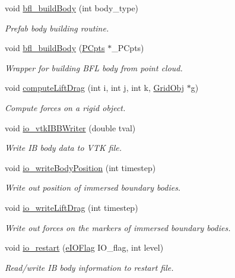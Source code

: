 \begin{DoxyCompactItemize}
void \hyperlink{class_object_manager_ab14652a66537fba9f49a68d6e11605e0}{bfl\+\_\+build\+Body} (int body\+\_\+type)
\begin{DoxyCompactList}\small\item\em Prefab body building routine. \end{DoxyCompactList}\item 
void \hyperlink{class_object_manager_a8cd5fa724cbd50bcd00b940e5ae4a687}{bfl\+\_\+build\+Body} (\hyperlink{class_p_cpts}{P\+Cpts} $\ast$\+\_\+\+P\+Cpts)
\begin{DoxyCompactList}\small\item\em Wrapper for building B\+FL body from point cloud. \end{DoxyCompactList}\item 
void \hyperlink{class_object_manager_a6a35b34d77e7cd56060a6953d0d0860a}{compute\+Lift\+Drag} (int i, int j, int k, \hyperlink{class_grid_obj}{Grid\+Obj} $\ast$g)
\begin{DoxyCompactList}\small\item\em Compute forces on a rigid object. \end{DoxyCompactList}\item 
void \hyperlink{class_object_manager_a9bcee530acc6e99f80a53d7ddb757989}{io\+\_\+vtk\+I\+B\+B\+Writer} (double tval)
\begin{DoxyCompactList}\small\item\em Write IB body data to V\+TK file. \end{DoxyCompactList}\item 
void \hyperlink{class_object_manager_aca1fa71a37c8e02ebe40fdc932350c15}{io\+\_\+write\+Body\+Position} (int timestep)
\begin{DoxyCompactList}\small\item\em Write out position of immersed boundary bodies. \end{DoxyCompactList}\item 
void \hyperlink{class_object_manager_a7f3c0860b78203671cd858532492555d}{io\+\_\+write\+Lift\+Drag} (int timestep)
\begin{DoxyCompactList}\small\item\em Write out forces on the markers of immersed boundary bodies. \end{DoxyCompactList}\item 
void \hyperlink{class_object_manager_aaa4689c73e755a1214356154a76a06fa}{io\+\_\+restart} (\hyperlink{_grid_obj_8h_ad1926c22ad82853adff44c4b76b97827}{e\+I\+O\+Flag} I\+O\+\_\+flag, int level)
\begin{DoxyCompactList}\small\item\em Read/write IB body information to restart file. \end{DoxyCompactList}\item 

\end{DoxyCompactItemize}
